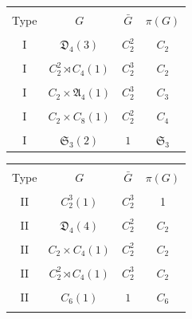 \documentclass[12pt,reqno]{amsart}
\theoremstyle{plain}
\theoremstyle{remark}
\theoremstyle{definition}
\numberwithin{equation}{section}
\def\fA{{\mathfrak A}}
\def\fD{{\mathfrak D}}
\def\fS{{\mathfrak S}}
\def\fS{{\mathfrak S}}
\begin{document}
\begin{table}[H]
\centering
\small

\begin{minipage}[t]{0.48\textwidth}
\centering
\begin{tabular}{|c|c|c|c|}
\hline&&&\\[-0.4cm]
Type& $G$ & $\bar G$&$\pi(G)$\\
\hline &&&\\[-0.4cm]

I&$\fD_4(3)$&$C_2^2$&$C_2$\\\hline&&&\\[-0.4cm]

I&$C_2^2\rtimes C_4(1)$&$C_2^3$&$C_2$\\\hline &&&\\[-0.4cm]

I&$C_2\times \fA_4(1)$&$C_2^3$&$C_3$\\\hline&&&\\[-0.4cm]

I&$C_2\times C_8(1)$&$C_2^2$&$C_4$\\\hline&&&\\[-0.4cm]

I&$\fS_3(2)$&$1$&$\fS_3$\\\hline
\end{tabular}
\end{minipage}
\hfill
\begin{minipage}[t]{0.48\textwidth}
\centering
\begin{tabular}{|c|c|c|c|}
\hline&&&\\[-0.4cm]
Type& $G$ & $\bar G$&$\pi(G)$\\
\hline &&&\\[-0.4cm]

II&$C_2^3(1)$&$C_2^3$&1\\\hline&&&\\[-0.4cm]

II&$\fD_4(4)$&$C_2^2$&$C_2$\\\hline&&&\\[-0.4cm]

II&$C_2\times C_4(1)$&$C_2^2$&$C_2$\\\hline&&&\\[-0.4cm]

II&$C_2^2\rtimes C_4(1)$&$C_2^3$&$C_2$\\\hline &&&\\[-0.4cm]

II&$C_6(1)$&$1$&$C_6$\\\hline         &&&\\[-0.4cm]


\end{tabular}
\end{minipage}
\end{table}
\end{document}
